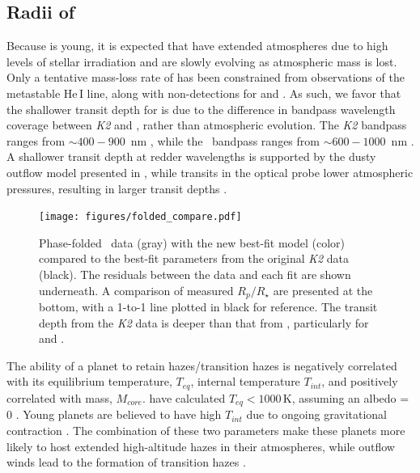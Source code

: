 \documentclass[twocolumn]{aastex631}
\begin{document}
\subsection{Radii of \planetknown}

Because \sname is young, it is expected that \allplanets have extended atmospheres due to high levels of stellar irradiation \citep{OwenWu2017} and are slowly evolving as atmospheric mass is lost. Only a tentative mass-loss rate of \planetd has been constrained from observations of the metastable He\,\textsc{I} line, along with non-detections for \planetb and \planetc \citep{Vissapragada21}. As such, we favor that the shallower transit depth for \allplanets is due to the difference in bandpass wavelength coverage between \textit{K2} and \tess, rather than atmospheric evolution. The \textit{K2} bandpass ranges from $\sim 400-900$~nm \citep{Howell2014}, while the \tess\ bandpass ranges from $\sim 600-1000$~nm \citep{Ricker2015}. A shallower transit depth at redder wavelengths is supported by the dusty outflow model presented in \citep{wang19}, while transits in the optical probe lower atmospheric pressures, resulting in larger transit depths \citep{gao20}.

\begin{figure}[!ht]
\begin{center}
\texttt{[image: figures/folded\_compare.pdf]}
\caption{Phase-folded \tess\ data (gray) with the new best-fit model (color) compared to the best-fit parameters from the original \textit{K2} data (black). The residuals between the data and each fit are shown underneath. A comparison of measured $R_p/R_\star$ are presented at the bottom, with a 1-to-1 line plotted in black for reference. The transit depth from the \textit{K2} data is deeper than that from \tess, particularly for \planetb and \planete.} \label{fig:compare}
\end{center}
\end{figure}

The ability of a planet to retain hazes/transition hazes is negatively correlated with its equilibrium temperature, $T_{eq}$, internal temperature $T_{int}$, and positively correlated with mass, $M_{core}$. \planetknown have calculated $T_{eq} < 1000$\,K, assuming an albedo = 0 \citep{David2019a}. Young planets are believed to have high $T_{int}$ due to ongoing gravitational contraction \citep{gu04}. The combination of these two parameters make these planets more likely to host extended high-altitude hazes in their atmospheres, while outflow winds lead to the formation of transition hazes \citep{gao20}. 
\end{document}
